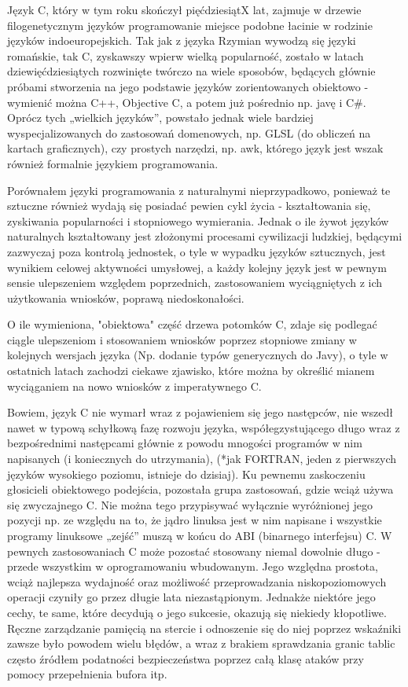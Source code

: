 Język C, który w tym roku skończył pięćdziesiątX lat, zajmuje w drzewie filogenetycznym języków programowanie miejsce podobne łacinie w rodzinie języków indoeuropejskich. Tak jak z języka Rzymian wywodzą się języki romańskie, tak C, zyskawszy wpierw wielką popularność, zostało w latach dziewięćdziesiątych rozwinięte twórczo na wiele sposobów, będących głównie próbami stworzenia na jego podstawie języków zorientowanych obiektowo - wymienić można C++, Objective C, a potem już pośrednio np. javę i C\#. 
Oprócz tych „wielkich języków”, powstało jednak wiele bardziej wyspecjalizowanych do zastosowań domenowych, np. GLSL (do obliczeń na kartach graficznych), czy prostych narzędzi, np. awk, którego język jest wszak również formalnie językiem programowania.

Porównałem języki programowania z naturalnymi nieprzypadkowo, ponieważ te sztuczne również wydają się posiadać pewien cykl życia - kształtowania się, zyskiwania popularności i stopniowego wymierania. Jednak o ile żywot języków naturalnych kształtowany jest złożonymi procesami cywilizacji ludzkiej, będącymi zazwyczaj poza kontrolą jednostek, o tyle w wypadku języków sztucznych, jest wynikiem celowej aktywności umysłowej, a każdy kolejny język jest w pewnym sensie ulepszeniem względem poprzednich, zastosowaniem wyciągniętych z ich użytkowania wniosków, poprawą niedoskonałości. 

O ile wymieniona, "obiektowa" część drzewa potomków C, zdaje się podlegać ciągle ulepszeniom i stosowaniem wniosków poprzez stopniowe zmiany w kolejnych wersjach języka (Np. dodanie typów generycznych do Javy), o tyle w ostatnich latach zachodzi ciekawe zjawisko, które można by określić mianem wyciąganiem na nowo wniosków z imperatywnego C.

Bowiem, język C nie wymarł wraz z pojawieniem się jego następców, nie wszedł nawet w typową schyłkową fazę rozwoju języka, współegzystującego długo wraz z bezpośrednimi następcami głównie z powodu mnogości programów w nim napisanych (i koniecznych do utrzymania), (*jak FORTRAN, jeden z pierwszych języków wysokiego poziomu, istnieje do dzisiaj). Ku pewnemu zaskoczeniu głosicieli obiektowego podejścia, pozostała grupa zastosowań, gdzie wciąż używa się zwyczajnego C. Nie można tego przypisywać wyłącznie wyróżnionej jego pozycji np. ze względu na to, że jądro linuksa jest w nim napisane i wszystkie programy linuksowe „zejść” muszą w końcu do ABI (binarnego interfejsu) C. W pewnych zastosowaniach C może pozostać stosowany niemal dowolnie długo - przede wszystkim w oprogramowaniu wbudowanym. Jego względna prostota, wciąż najlepsza wydajność oraz możliwość przeprowadzania niskopoziomowych operacji czyniły go przez długie lata niezastąpionym. Jednakże niektóre jego cechy, te same, które decydują o jego sukcesie, okazują się niekiedy kłopotliwe. Ręczne zarządzanie pamięcią na stercie i odnoszenie się do niej poprzez wskaźniki zawsze było powodem wielu błędów, a wraz z brakiem sprawdzania granic tablic często źródłem podatności bezpieczeństwa poprzez całą klasę ataków przy pomocy przepełnienia bufora itp. 

